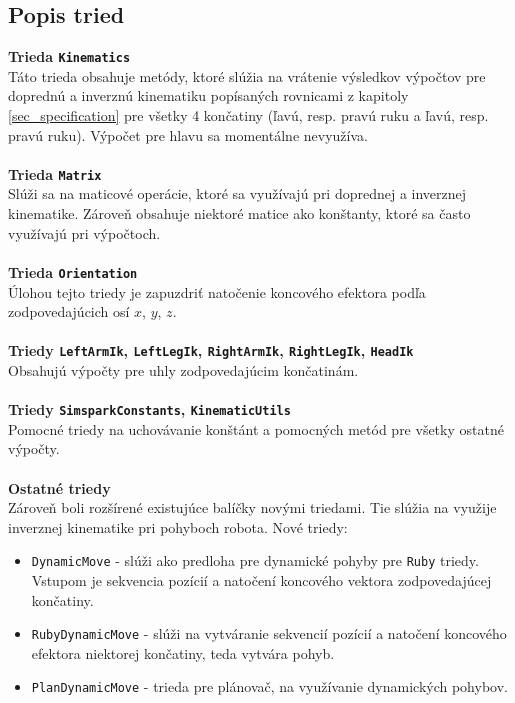 \subsection{Popis tried} \label{sec_classes_desc}
\textbf{Trieda \texttt{Kinematics}}
\\
Táto trieda obsahuje metódy, ktoré slúžia na vrátenie výsledkov výpočtov pre doprednú a inverznú kinematiku popísaných rovnicami z kapitoly \ref{sec_specification} pre všetky 4 končatiny (ľavú, resp. pravú ruku a ľavú, resp. pravú ruku). Výpočet pre hlavu sa momentálne nevyužíva.
\\\\
\textbf{Trieda \texttt{Matrix}}
\\
Slúži sa na maticové operácie, ktoré sa využívajú pri doprednej a inverznej kinematike. Zároveň obsahuje niektoré matice ako konštanty, ktoré sa často využívajú pri výpočtoch. 
\\\\
\textbf{Trieda \texttt{Orientation}}
\\
Úlohou tejto triedy je zapuzdriť natočenie koncového efektora podľa zodpovedajúcich osí $x$, $y$, $z$.
\\\\
\textbf{Triedy \texttt{LeftArmIk}, \texttt{LeftLegIk}, \texttt{RightArmIk}, \texttt{RightLegIk}, \texttt{HeadIk}}
\\
Obsahujú výpočty pre uhly zodpovedajúcim končatinám.
\\\\
\textbf{Triedy \texttt{SimsparkConstants}, \texttt{KinematicUtils}}
\\
Pomocné triedy na uchovávanie konštánt a pomocných metód pre všetky ostatné výpočty.
\\\\
\textbf{Ostatné triedy}\\
Zároveň boli rozšírené existujúce balíčky novými triedami. Tie slúžia na využije inverznej kinematike pri pohyboch robota. Nové triedy:
\begin{itemize}
	\item \texttt{DynamicMove} - slúži ako predloha pre dynamické pohyby pre \texttt{Ruby} triedy. Vstupom je sekvencia pozícií a natočení koncového vektora zodpovedajúcej končatiny.
	\item \texttt{RubyDynamicMove} - slúži na vytváranie sekvencií pozícií a natočení koncového efektora niektorej končatiny, teda vytvára pohyb.
	\item \texttt{PlanDynamicMove} - trieda pre plánovač, na využívanie dynamických pohybov.
\end{itemize}


